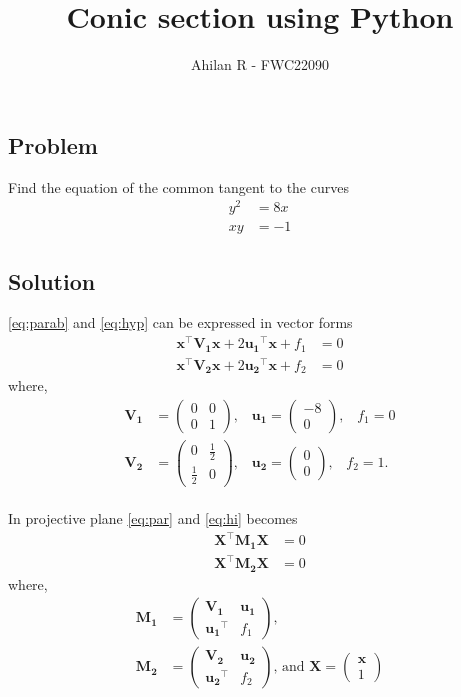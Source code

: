 \documentclass[journal,12pt,twocolumn]{IEEEtran}
\title{Conic section using Python}
\author{Ahilan R - FWC22090}
\let\vec\mathbf
\newcommand{\myvec}[1]{\ensuremath{\begin{pmatrix}#1\end{pmatrix}}}
\begin{document}
\maketitle

\subsection*{\textbf{Problem}}
Find the equation of the common tangent to the curves 
\begin{align}
		y^2&=8x \label{eq:parab} \\
		xy&=-1 \label{eq:hyp}
\end{align}
\subsection*{\textbf{Solution}}
\eqref{eq:parab} and \eqref{eq:hyp} can be expressed in vector forms
\begin{align}
		\vec{x}^{\top}\vec{V_1}\vec{x} + 2\vec{u_1}^{\top}\vec{x} + f_1 &= 0  \label{eq:par} \\
		\vec{x}^{\top}\vec{V_2}\vec{x}  + 2\vec{u_2}^{\top}\vec{x} + f_2 &= 0 \label{eq:hi} 
\end{align}
where,
\begin{align}
		\vec{V_1} &= \myvec{0&0\\0&1} \text{,}\quad  
		\vec{u_1} = \myvec{-8\\0}  \text{,} \quad  f_1 = 0\\
		\vec{V_2} &= \myvec{0&\frac{1}{2}\\\frac{1}{2}&0} \text{,} \quad 
		  \vec{u_2} = \myvec{0\\0} \text{,}  \quad f_2 = 1 \text{.} %
\end{align}
\\
In projective plane \eqref{eq:par} and \eqref{eq:hi} becomes %
\begin{align}
		\vec{X}^{\top}\vec{M_1}\vec{X} &= 0 \label{eq:ppar} \\
		\vec{X}^{\top}\vec{M_2}\vec{X} &= 0 \label{eq:phi} 
\end{align}
where,
\begin{align}
		\vec{M_1} &= \myvec{\vec{V_1}&\vec{u_1}\\\vec{u_1}^{\top}&f_1} \text{, } \\[0.5ex]
		\vec{M_2} &= \myvec{\vec{V_2}&\vec{u_2}\\\vec{u_2}^{\top}&f_2} \text{,} \text{ and } 
		\vec{X}=\myvec{\vec{x}\\1} 
\end{align}
\end{document}
